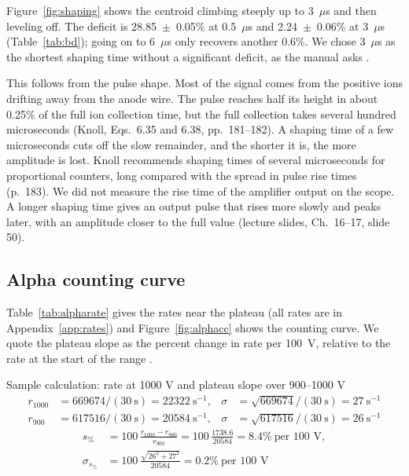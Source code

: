 \documentclass[12pt]{article}
\begin{document}
Figure~\ref{fig:shaping} shows the centroid climbing steeply up to 3~$\mu$s and then leveling off. The deficit is 28.85~$\pm$~0.05\% at 0.5~$\mu$s and 2.24~$\pm$~0.06\% at 3~$\mu$s (Table~\ref{tab:bd}); going on to 6~$\mu$s only recovers another 0.6\%. We chose 3~$\mu$s as the shortest shaping time without a significant deficit, as the manual asks \cite{labmanual}.

This follows from the pulse shape. Most of the signal comes from the positive ions drifting away from the anode wire. The pulse reaches half its height in about 0.25\% of the full ion collection time, but the full collection takes several hundred microseconds (Knoll, Eqs.~6.35 and 6.38, pp.~181--182). A shaping time of a few microseconds cuts off the slow remainder, and the shorter it is, the more amplitude is lost. Knoll recommends shaping times of several microseconds for proportional counters, long compared with the spread in pulse rise times (p.~183). We did not measure the rise time of the amplifier output on the scope. A longer shaping time gives an output pulse that rises more slowly and peaks later, with an amplitude closer to the full value (lecture slides, Ch.~16--17, slide 50).

\subsection{Alpha counting curve}

Table~\ref{tab:alpharate} gives the rates near the plateau (all rates are in Appendix~\ref{app:rates}) and Figure~\ref{fig:alphacc} shows the counting curve. We quote the plateau slope as the percent change in rate per 100~V, relative to the rate at the start of the range \cite{knoll}.

\begin{samplecalc}{Sample calculation: rate at 1000 V and plateau slope over 900--1000 V}
\begin{align*}
r_{1000} &= 669674/(30\ \text{s}) = 22322\ \text{s}^{-1}, & \sigma &= \sqrt{669674}/(30\ \text{s}) = 27\ \text{s}^{-1}\\
r_{900} &= 617516/(30\ \text{s}) = 20584\ \text{s}^{-1}, & \sigma &= \sqrt{617516}/(30\ \text{s}) = 26\ \text{s}^{-1}
\end{align*}
\begin{align*}
s_{\%} &= 100\,\frac{r_{1000} - r_{900}}{r_{900}} = 100\,\frac{1738.6}{20584} = 8.4\%\ \text{per 100 V},\\
\sigma_{s_\%} &= 100\,\frac{\sqrt{26^2 + 27^2}}{20584} = 0.2\%\ \text{per 100 V}
\end{align*}
\end{samplecalc}
\end{document}
